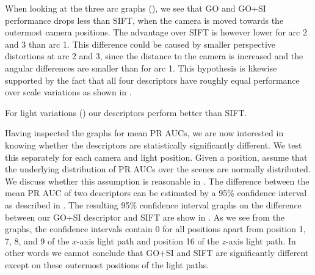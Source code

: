 \documentclass[thesis.tex]{subfiles}
\begin{document}
When looking at the three arc graphs (), we see that GO and GO+SI performance drops less than SIFT, when the camera is moved towards the outermost camera positions. The advantage over SIFT is however lower for arc 2 and 3 than arc 1. This difference could be caused by smaller perspective distortions at arc 2 and 3, since the distance to the camera is increased and the angular differences are smaller than for arc 1.
This hypothesis is likewise supported by the fact that all four descriptors have roughly equal performance over scale variations as shown in .

For light variations () our descriptors perform better than SIFT.

Having inspected the graphs for mean PR AUCs, we are now interested in knowing whether the descriptors are statistically significantly different. We test this separately for each camera and light position. Given a position, assume that the underlying distribution of PR AUCs over the scenes are normally distributed. We discuss whether this assumption is reasonable in . The difference between the mean PR AUC of two descriptors can be estimated by a 95\% confidence interval as described in .
The resulting 95\% confidence interval graphs on the difference between our GO+SI descriptor and SIFT are show in . As we see from the graphs, the confidence intervals contain 0 for all positions apart from position 1, 7, 8, and 9 of the $x$-axis light path and position 16 of the $z$-axis light path. In other words we cannot conclude that GO+SI and SIFT are significantly different except on these outermost positions of the light paths.
\end{document}
